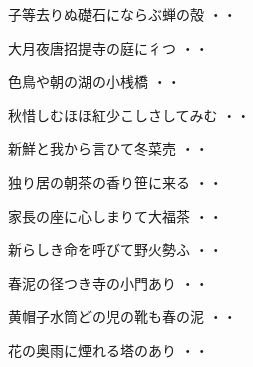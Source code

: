 \begin{shiika}子等去りぬ礎石にならぶ蝉の殻
\hfill{・・}\end{shiika}
\vspace{0.6cm}
\begin{shiika}大月夜唐招提寺の庭に彳つ
\hfill{・・}\end{shiika}
\vspace{0.6cm}
\begin{shiika}色鳥や朝の湖の小桟橋
\hfill{・・}\end{shiika}
\vspace{0.6cm}
\begin{shiika}秋惜しむほほ紅少こしさしてみむ
\hfill{・・}\end{shiika}
\vspace{0.6cm}
\begin{shiika}新鮮と我から言ひて冬菜売
\hfill{・・}\end{shiika}
\vspace{0.6cm}
\begin{shiika}独り居の朝茶の香り笹に来る
\hfill{・・}\end{shiika}
\vspace{0.6cm}
\begin{shiika}家長の座に心しまりて大福茶
\hfill{・・}\end{shiika}
\vspace{0.6cm}
\begin{shiika}新らしき命を呼びて野火勢ふ
\hfill{・・}\end{shiika}
\vspace{0.6cm}
\begin{shiika}春泥の径つき寺の小門あり
\hfill{・・}\end{shiika}
\vspace{0.6cm}
\begin{shiika}黄帽子水筒どの児の靴も春の泥
\hfill{・・}\end{shiika}
\vspace{0.6cm}
\begin{shiika}花の奥雨に煙れる塔のあり
\hfill{・・}\end{shiika}
\vspace{0.6cm}
